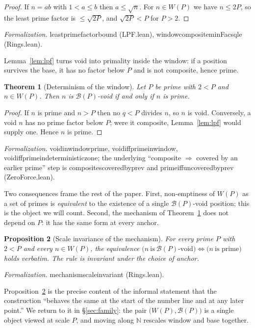 \documentclass[11pt,a4paper]{amsart}
\theoremstyle{plain}
\newtheorem{theorem}{Theorem}[section]
\newtheorem{proposition}[theorem]{Proposition}
\theoremstyle{definition}
\theoremstyle{plain}
\theoremstyle{remark}
\newcommand{\lean}[1]{\begingroup\upshape\ttfamily\def\_{\textunderscore\allowbreak}#1\endgroup}
\newcommand{\Formal}[1]{\par\smallskip\noindent\begingroup\raggedright\emph{Formalization.} #1\par\endgroup\smallskip}
\begin{document}
\begin{proof}
If $n=ab$ with $1<a\le b$ then $a\le\sqrt n$. For $n\in W(P)$ we have $n\le 2P$, so the
least prime factor is $\le\sqrt{2P}$, and $\sqrt{2P}<P$ for $P>2$.
\end{proof}

\Formal{\lean{least\_prime\_factor\_bound} (\lean{LPF.lean}),
\lean{window\_composite\_minFac\_sq\_le} (\lean{Rings.lean}).}

Lemma~\ref{lem:lpf} turns void into primality inside the window: if a position survives
the base, it has no factor below $P$ and is not composite, hence prime.

\begin{theorem}[Determinism of the window]\label{thm:det}
Let $P$ be prime with $2<P$ and $n\in W(P)$. Then $n$ is $\mathcal{B}(P)$-void if and only
if $n$ is prime.
\end{theorem}

\begin{proof}
If $n$ is prime and $n>P$ then no $q<P$ divides $n$, so $n$ is void. Conversely, a void
$n$ has no prime factor below $P$; were it composite, Lemma~\ref{lem:lpf} would supply
one. Hence $n$ is prime.
\end{proof}

\Formal{\lean{void\_in\_window\_prime}, \lean{void\_iff\_prime\_in\_window},
\lean{void\_iff\_prime\_in\_deterministic\_zone}; the underlying
\enquote{composite $\Rightarrow$ covered by an earlier prime} step is
\lean{composites\_covered\_by\_prev} and \lean{prime\_iff\_uncovered\_by\_prev}
(\lean{ZeroForce.lean}).}

Two consequences frame the rest of the paper. First, non-emptiness of $W(P)$ as a set of
primes is \emph{equivalent} to the existence of a single $\mathcal{B}(P)$-void position;
this is the object we will count. Second, the mechanism of Theorem~\ref{thm:det} does not
depend on $P$: it has the same form at every anchor.

\begin{proposition}[Scale invariance of the mechanism]\label{prop:scale}
For every prime $P$ with $2<P$ and every $n\in W(P)$, the equivalence
$\big(n\ \text{is}\ \mathcal{B}(P)\text{-void}\big)\Leftrightarrow\big(n\ \text{is prime}\big)$
holds verbatim. The rule is invariant under the choice of anchor.
\end{proposition}

\Formal{\lean{mechanism\_scale\_invariant} (\lean{Rings.lean}).}

Proposition~\ref{prop:scale} is the precise content of the informal statement that the
construction \enquote{behaves the same at the start of the number line and at any later
point.} We return to it in \S\ref{sec:family}: the pair $\big(W(P),\mathcal{B}(P)\big)$ is
a single object viewed at scale $P$, and moving along $\mathbb{N}$ rescales window and base
together.
\end{document}
